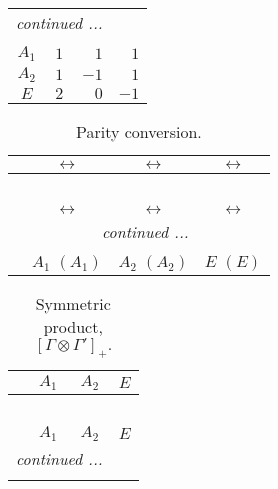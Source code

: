 \documentclass[fleqn,10pt,landscape]{article}
\begin{document}
\begin{itemize}
\begin{center}
\begin{longtable}{c|rrr}
 \hline \hline
\multicolumn{3}{r}{\footnotesize\it continued ...} \\ \endfoot

 \hline \hline
\multicolumn{3}{r}{} \\ \endlastfoot

$ A_{1} $ & $ 1 $ & $ 1 $ & $ 1 $ \\
$ A_{2} $ & $ 1 $ & $ -1 $ & $ 1 $ \\
$ E $ & $ 2 $ & $ 0 $ & $ -1 $ \\
\end{longtable}
\end{center}
\begin{center}
\renewcommand{\arraystretch}{1.0}
\begin{longtable}{cccc}
\caption{Parity conversion.}
 \\
 \hline \hline
 & $\leftrightarrow$ & $\leftrightarrow$ & $\leftrightarrow$ \\ \hline \endfirsthead

\multicolumn{3}{l}{\tablename\ \thetable{}} \\
 \hline \hline
 & $\leftrightarrow$ & $\leftrightarrow$ & $\leftrightarrow$ \\ \hline \endhead

 \hline \hline
\multicolumn{3}{r}{\footnotesize\it continued ...} \\ \endfoot

 \hline \hline
\multicolumn{3}{r}{} \\ \endlastfoot

 & $ A_{1}\,\,(A_{1}) $ & $ A_{2}\,\,(A_{2}) $ & $ E\,\,(E) $ \\
\end{longtable}
\end{center}
\begin{center}
\renewcommand{\arraystretch}{1.0}
\begin{longtable}{c|ccc}
\caption{Symmetric product, $[\Gamma\otimes\Gamma']_+.$}
 \\
 \hline \hline
 & $ A_{1} $ & $ A_{2} $ & $ E $ \\ \hline \endfirsthead

\multicolumn{3}{l}{\tablename\ \thetable{}} \\
 \hline \hline
 & $ A_{1} $ & $ A_{2} $ & $ E $ \\ \hline \endhead

 \hline \hline
\multicolumn{3}{r}{\footnotesize\it continued ...} \\ \endfoot


\end{longtable}
\end{center}
\end{itemize}
\end{document}
